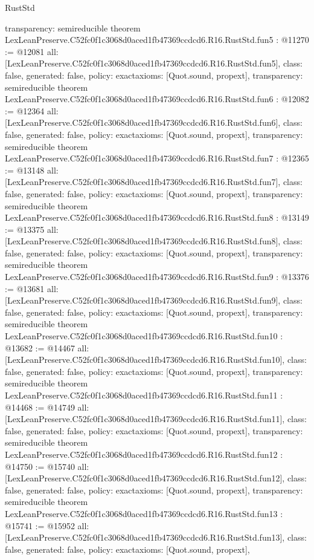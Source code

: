 \begin{lexlean}{RustStd}
\begin{coremodule}
{  transparency: semireducible
}
theorem LexLeanPreserve.C52fc0f1c3068d0aced1fb47369ccdcd6.R16.RustStd.fun5 : @11270 := @12081 {
  all: [LexLeanPreserve.C52fc0f1c3068d0aced1fb47369ccdcd6.R16.RustStd.fun5],
  class: false,
  generated: false,
  policy: exact{axioms: [Quot.sound, propext]},
  transparency: semireducible
}
theorem LexLeanPreserve.C52fc0f1c3068d0aced1fb47369ccdcd6.R16.RustStd.fun6 : @12082 := @12364 {
  all: [LexLeanPreserve.C52fc0f1c3068d0aced1fb47369ccdcd6.R16.RustStd.fun6],
  class: false,
  generated: false,
  policy: exact{axioms: [Quot.sound, propext]},
  transparency: semireducible
}
theorem LexLeanPreserve.C52fc0f1c3068d0aced1fb47369ccdcd6.R16.RustStd.fun7 : @12365 := @13148 {
  all: [LexLeanPreserve.C52fc0f1c3068d0aced1fb47369ccdcd6.R16.RustStd.fun7],
  class: false,
  generated: false,
  policy: exact{axioms: [Quot.sound, propext]},
  transparency: semireducible
}
theorem LexLeanPreserve.C52fc0f1c3068d0aced1fb47369ccdcd6.R16.RustStd.fun8 : @13149 := @13375 {
  all: [LexLeanPreserve.C52fc0f1c3068d0aced1fb47369ccdcd6.R16.RustStd.fun8],
  class: false,
  generated: false,
  policy: exact{axioms: [Quot.sound, propext]},
  transparency: semireducible
}
theorem LexLeanPreserve.C52fc0f1c3068d0aced1fb47369ccdcd6.R16.RustStd.fun9 : @13376 := @13681 {
  all: [LexLeanPreserve.C52fc0f1c3068d0aced1fb47369ccdcd6.R16.RustStd.fun9],
  class: false,
  generated: false,
  policy: exact{axioms: [Quot.sound, propext]},
  transparency: semireducible
}
theorem LexLeanPreserve.C52fc0f1c3068d0aced1fb47369ccdcd6.R16.RustStd.fun10 : @13682 := @14467 {
  all: [LexLeanPreserve.C52fc0f1c3068d0aced1fb47369ccdcd6.R16.RustStd.fun10],
  class: false,
  generated: false,
  policy: exact{axioms: [Quot.sound, propext]},
  transparency: semireducible
}
theorem LexLeanPreserve.C52fc0f1c3068d0aced1fb47369ccdcd6.R16.RustStd.fun11 : @14468 := @14749 {
  all: [LexLeanPreserve.C52fc0f1c3068d0aced1fb47369ccdcd6.R16.RustStd.fun11],
  class: false,
  generated: false,
  policy: exact{axioms: [Quot.sound, propext]},
  transparency: semireducible
}
theorem LexLeanPreserve.C52fc0f1c3068d0aced1fb47369ccdcd6.R16.RustStd.fun12 : @14750 := @15740 {
  all: [LexLeanPreserve.C52fc0f1c3068d0aced1fb47369ccdcd6.R16.RustStd.fun12],
  class: false,
  generated: false,
  policy: exact{axioms: [Quot.sound, propext]},
  transparency: semireducible
}
theorem LexLeanPreserve.C52fc0f1c3068d0aced1fb47369ccdcd6.R16.RustStd.fun13 : @15741 := @15952 {
  all: [LexLeanPreserve.C52fc0f1c3068d0aced1fb47369ccdcd6.R16.RustStd.fun13],
  class: false,
  generated: false,
  policy: exact{axioms: [Quot.sound, propext]},
}
\end{coremodule}
\end{lexlean}
